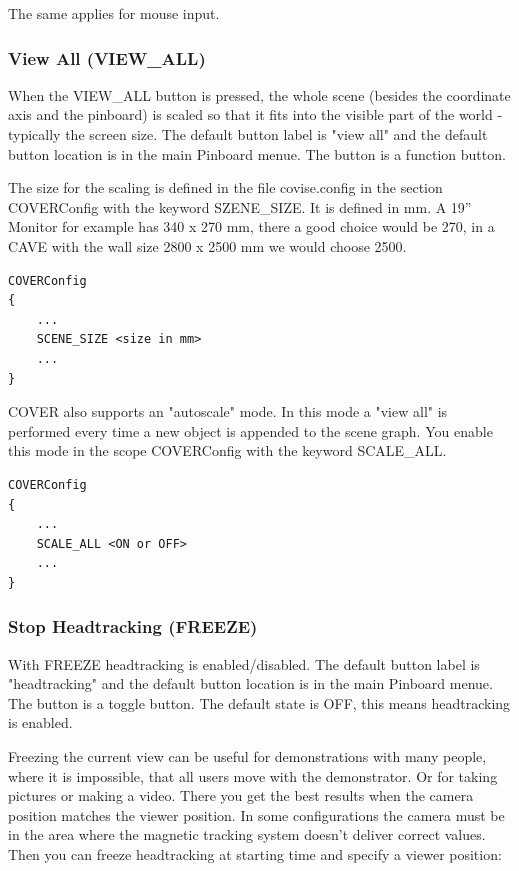The same applies for mouse input.
 		
\subsubsection{View All (VIEW\_ALL)}

When the VIEW\_ALL button is pressed, the whole scene 
(besides the coordinate axis and the pinboard) 
is scaled so that it fits into the visible part of the world - 
typically the screen size. 
The default button label is "view all" and
the default button location is in the main Pinboard menue. 
The button is a function button.

The size for the scaling is defined in the file covise.config in 
the section COVERConfig
with the keyword SZENE\_SIZE. It is defined in mm. A 19'' Monitor for
example has 340 x 270 mm, there a good choice would be 270, in a 
CAVE with the wall size 2800 x 2500 mm we would choose 2500.

\begin{samepage}
\begin{verbatim}
COVERConfig
{
    ...
    SCENE_SIZE <size in mm>
    ...
}
\end{verbatim}
\end{samepage}

COVER also supports an "autoscale" mode. In this mode a "view all" is performed
every time a new object is appended to the scene graph. You enable
this mode in the scope COVERConfig with the keyword SCALE\_ALL.
\begin{verbatim}
COVERConfig
{
    ...
    SCALE_ALL <ON or OFF>
    ...
}
\end{verbatim}

		
\subsubsection{Stop Headtracking (FREEZE)}
With FREEZE headtracking is enabled/disabled. 
The default button label is "headtracking" and
the default button location is in the main Pinboard menue. 
The button is a toggle button. The default state is 
OFF, this means headtracking is enabled. 

Freezing the current view can be useful for demonstrations with many 
people, where it is
impossible, that all users move with the demonstrator. Or for taking
pictures or making a video. There you get the best results when the
camera position matches the viewer position. In some configurations
the camera must be in the area where the magnetic tracking system doesn't
deliver correct values. Then you can freeze headtracking at starting time and
specify a viewer position:

